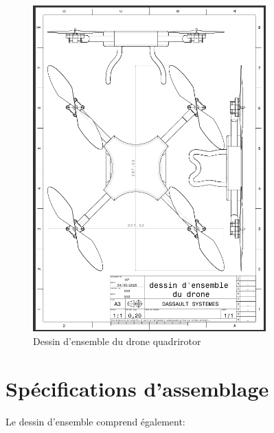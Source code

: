 \documentclass[a4paper,12pt]{report}
\begin{document}
\begin{figure}[H]
    \centering
    \includegraphics[width=0.8\textwidth]{images/dessin_ensemble_drone.png}
    \caption{Dessin d'ensemble du drone quadrirotor}
    \label{fig:dessin_ensemble}
\end{figure}

\section{Spécifications d'assemblage}
Le dessin d'ensemble comprend également:
\end{document}
